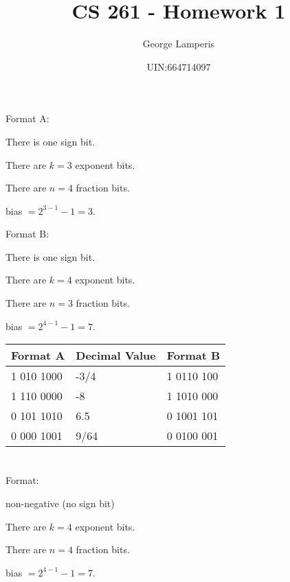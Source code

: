 \documentclass[letterpaper, 11pt]{article}
\title{CS 261 - Homework 1}
\author{George Lamperis}
\date{UIN:664714097}
\theoremstyle{mystyle}
\begin{document}
\maketitle

\section{}
Format A:
\begin{compactitem}
    \item There is one sign bit.
    \item There are $k=3$ exponent bits.
    \item There are $n=4$ fraction bits.
    \item bias $= 2^{3-1}-1 = 3 $.
\end{compactitem}

Format B:
\begin{compactitem}
    \item There is one sign bit.
    \item There are $k=4$ exponent bits.
    \item There are $n=3$ fraction bits.
    \item bias $= 2^{4-1}-1 = 7 $.

\end{compactitem}

\begin{tabular}{M|M|M}
    Format A    & Decimal Value     & Format B    \\  010 1000  &  -3/4             & 1 0110 100  \\ 
    1 110 0000  &  -8               & 1 1010 000  \\ 
    0 101 1010  &  6.5              & 0 1001 101  \\
    0 000 1001  &  9/64             & 0 0100 001  \\
\end{tabular}


\section{}
Format:
\begin{compactitem}
    \item non-negative (no sign bit)
    \item There are $k=4$ exponent bits.
    \item There are $n=4$ fraction bits.
    \item bias $= 2^{4-1}-1 = 7 $.
\end{compactitem}
\end{document}
